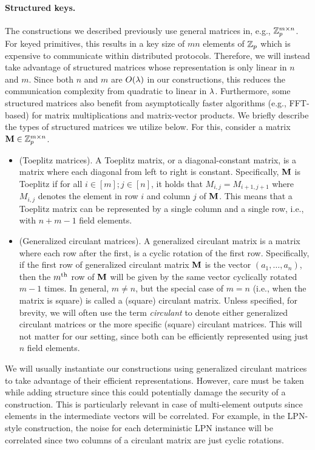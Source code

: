 \paragraph{Structured keys.}
The constructions we described previously use general matrices in, e.g., $\mathbb{Z}_p^{m \times n}$. For keyed primitives, this results in a key size of $mn$ elements of $\mathbb{Z}_p$ which is expensive to communicate within distributed protocols. Therefore, we will instead take advantage of structured matrices whose representation is only linear in $n$ and $m$. Since both $n$ and $m$ are $O(\lambda)$ in our constructions, this reduces the communication complexity from quadratic to linear in $\lambda$. Furthermore, some structured matrices also benefit from asymptotically faster algorithms (e.g., FFT-based) for matrix multiplications and matrix-vector products. We briefly describe the types of structured matrices we utilize below. For this, consider a matrix $\mat{M} \in \Z_p^{m \times n}$.

\begin{itemize}
    \item (Toeplitz matrices).
    A Toeplitz matrix, or a diagonal-constant matrix, is a matrix where each diagonal from left to right is constant. Specifically, $\mat{M}$ is Toeplitz if for all $i \in [m]; j \in [n]$, it holds that $M_{i,j} = M_{i+1, j+1}$ where $M_{i,j}$ denotes the element in row $i$ and column $j$ of $\mat{M}$. This means that a Toeplitz matrix can be represented by a single column and a single row, i.e., with $n + m - 1$ field elements.

    \item (Generalized circulant matrices). 
    A generalized circulant matrix is a matrix where each row after the first, is a cyclic rotation of the first row. Specifically, if the first row of generalized circulant matrix $\mat{M}$ is the vector $(a_1, \dots, a_n)$, then the $m^{\textnormal{th}}$ row of $\mat{M}$ will be given by the same vector cyclically rotated $m-1$ times. In general, $m \neq n$, but the special case of $m = n$ (i.e., when the matrix is square) is called a (square) circulant matrix. Unless specified, for brevity, we will often use the term \textit{circulant} to denote either generalized circulant matrices or the more specific (square) circulant matrices. This will not matter for our setting, since both can be efficiently represented using just $n$ field elements.
\end{itemize}
\iffull
We will usually instantiate our constructions using generalized circulant matrices to take advantage of their efficient representations. However, care must be taken while adding structure since this could potentially damage the security of a construction. This is particularly relevant in case of multi-element outputs since elements in the intermediate vectors will be correlated. For example, in the LPN-style construction, the noise for each deterministic LPN instance will be correlated since two columns of a circulant matrix are just cyclic rotations. 

